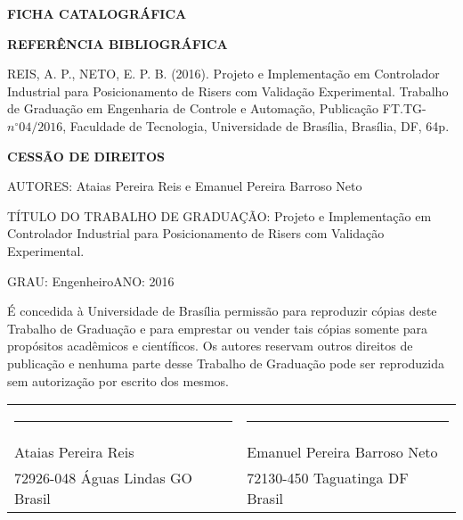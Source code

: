 \noindent \textbf{FICHA CATALOGRÁFICA}

\noindent %

\noindent \medskip{}


\noindent \textbf{REFERÊNCIA BIBLIOGRÁFICA}

REIS, A. P., NETO, E. P. B. (2016). Projeto e Implementação em Controlador Industrial para Posicionamento de Risers com Validação Experimental. Trabalho de Graduação em Engenharia de Controle e Automação, Publicação FT.TG-$n^{\circ}04/2016$, Faculdade de Tecnologia, Universidade
de Brasília, Brasília, DF, 64p.

\noindent \bigskip{}


\noindent \textbf{CESSÃO DE DIREITOS}

\noindent AUTORES: Ataias Pereira Reis e Emanuel Pereira Barroso Neto

TÍTULO DO TRABALHO DE GRADUAÇÃO: Projeto e Implementação em Controlador Industrial para Posicionamento de Risers com Validação Experimental.
\noindent \medskip{}


\noindent GRAU: Engenheiro\hfill{}ANO: 2016\hfill{}

\noindent \medskip{}


É concedida à Universidade de Brasília permissão para reproduzir cópias
deste Trabalho de Graduação e para emprestar ou vender tais cópias
somente para propósitos acadêmicos e científicos. Os autores reservam
outros direitos de publicação e nenhuma parte desse Trabalho de Graduação
pode ser reproduzida sem autorização por escrito dos mesmos.

\noindent \bigskip{}

\noindent \begin{tabular}{ll}
	\rule[0.5ex]{0.5\columnwidth}{1pt} & \rule[0.5ex]{0.5\columnwidth}{1pt}\\
	Ataias Pereira Reis & Emanuel Pereira Barroso Neto\\
	72926-048 Águas Lindas \textendash{} GO \textendash{} Brasil & 72130-450 Taguatinga \textendash{} DF \textendash{} Brasil
\end{tabular}